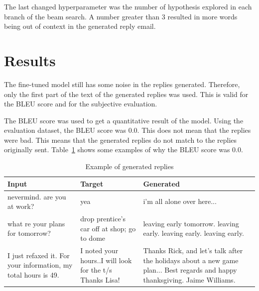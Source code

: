 \documentclass[letterpaper]{article}
\begin{document}
The last changed hyperparameter was the number of hypothesis explored in each branch of the beam search. A number greater than \num{3} resulted in more words being out of context in the generated reply email.


\section{Results}

The fine-tuned model still has some noise in the replies generated. Therefore, only the first part of the text of the generated replies was used. This is valid for the BLEU score and for the subjective evaluation.

The BLEU score was used to get a quantitative result of the model. Using the evaluation dataset, the BLEU score was \num{0.0}. This does not mean that the replies were bad. This means that the generated replies do not match to the replies originally sent. Table~\ref{table:example-reply-bleu} shows some examples of why the BLEU score was \num{0.0}.

\begin{table}[ht]
    \centering
    \begin{tabularx}{0.47\textwidth}{|X|X|X|}
        \hline
        \textbf{Input}                                                  & \textbf{Target}                                          & \textbf{Generated}                                                                                                           \\
        \hline
        nevermind.  are you at work?                                    & yea                                                      & i'm all alone over here...                                                                                                   \\
        \hline
        what re your plans for tomorrow?                                & drop prentice's car off at shop; go to dome              & leaving early tomorrow. leaving early. leaving early. leaving early.                                                         \\
        \hline
        I just refaxed it.  For your information, my total hours is 49. & I noted your hours..I will look for the t/s Thanks Lisa! & Thanks Rick, and let's talk after the holidays about a new game plan... Best regards and happy thanksgiving. Jaime Williams. \\
        \hline
    \end{tabularx}
    \caption{Example of generated replies}
    \label{table:example-reply-bleu}
\end{table}
\end{document}
